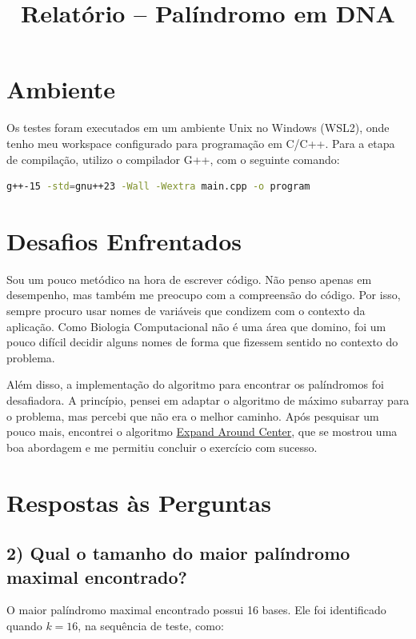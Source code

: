 \documentclass[a4paper,12pt]{article}
\title{Relatório -- Palíndromo em DNA}
\author{}
\date{}
\begin{document}
\maketitle

\section{Ambiente}

Os testes foram executados em um ambiente Unix no Windows (WSL2), onde tenho meu workspace configurado para programação em C/C++. Para a etapa de compilação, utilizo o compilador G++, com o seguinte comando:

\begin{lstlisting}[language=bash]
g++-15 -std=gnu++23 -Wall -Wextra main.cpp -o program
\end{lstlisting}

\section{Desafios Enfrentados}

Sou um pouco metódico na hora de escrever código. Não penso apenas em desempenho, mas também me preocupo com a compreensão do código. Por isso, sempre procuro usar nomes de variáveis que condizem com o contexto da aplicação. Como Biologia Computacional não é uma área que domino, foi um pouco difícil decidir alguns nomes de forma que fizessem sentido no contexto do problema.

Além disso, a implementação do algoritmo para encontrar os palíndromos foi desafiadora. A princípio, pensei em adaptar o algoritmo de máximo subarray para o problema, mas percebi que não era o melhor caminho. Após pesquisar um pouco mais, encontrei o algoritmo
\href{https://www.geeksforgeeks.org/dsa/longest-palindromic-substring/}{Expand Around Center}, que se mostrou uma boa abordagem e me permitiu concluir o exercício com sucesso.

\section{Respostas às Perguntas}

\subsection*{2) Qual o tamanho do maior palíndromo maximal encontrado?}

O maior palíndromo maximal encontrado possui 16 bases. Ele foi identificado quando $k = 16$, na sequência de teste, como:
\end{document}

